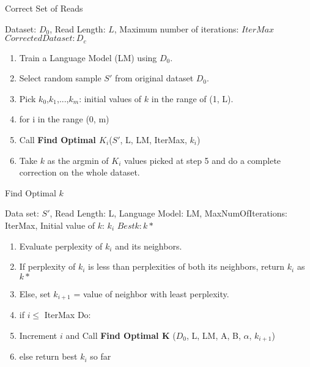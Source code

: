 \begin{minipage}[t]{.45\textwidth}
\begin{algorithm}[H]
\caption{Correct Set of Reads}
\begin{algorithmic} 
\REQUIRE Dataset: $D_{0}$, Read Length: $L$, Maximum number of iterations: $IterMax$
\ENSURE $Corrected Dataset: D_c$
\begin{enumerate}
\itemsep0em
\item Train a Language Model (LM) using $D_{0}$.
\item Select random sample $S'$ from original dataset $D_{0}$.
\item Pick $k_0$,$k_1$,...,$k_m$: initial values of $k$ in the range of (1, L).
\item for i in the range (0, m) 
\item \quad Call \textbf{Find Optimal $K_i$}($S'$, L, LM, IterMax, $k_i$)
\item Take $k$ as the argmin of $K_i$ values picked at step 5 and do a complete correction on the whole dataset.
\end{enumerate}
\end{algorithmic}
\end{algorithm}
\end{minipage}
\hfill
\begin{minipage}[t]{.45\textwidth}
\begin{algorithm} [H]
\caption{Find Optimal $k$}
\begin{algorithmic} 
\REQUIRE Data set: $S'$, Read Length: L, Language Model: LM, MaxNumOfIterations: IterMax, Initial value of $k$: $k_i$ 
\ENSURE $Best k: k*$
\begin{enumerate}
\itemsep0em
\item %
Evaluate perplexity of $k_i$ and its neighbors.
\item If perplexity of $k_i$ is less than perplexities of both its neighbors, return $k_i$ as $k*$
\item Else, set $k_{i+1}$ = value of neighbor with least perplexity.
\item if $i \leq$ IterMax Do:
\item \quad Increment $i$ and Call \textbf{Find Optimal K} ($D_{0}$, L, LM, A, B, $\alpha$, $k_{i+1}$)
\item else  \quad return best $k_i$ so far
\end{enumerate}%
\end{algorithmic}
\end{algorithm}

\end{minipage}

